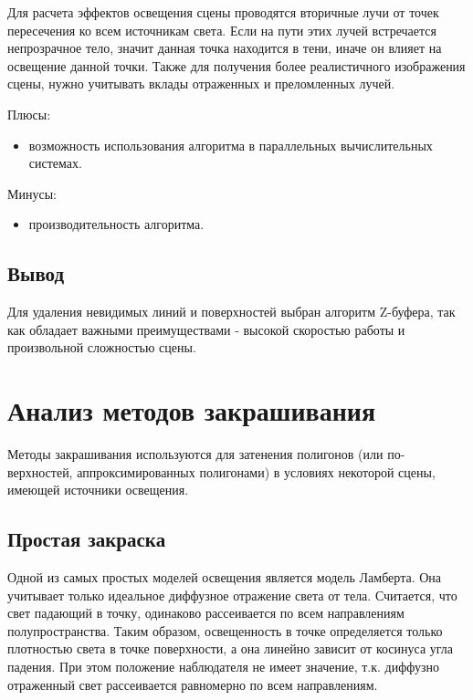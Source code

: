 Для расчета эффектов освещения сцены проводятся вторичные лучи от точек пересечения ко всем источникам света. Если на пути этих лучей встречается непрозрачное тело, значит данная точка находится в тени, иначе он влияет на освещение данной точки. Также для получения более реалистичного изображения сцены, нужно учитывать вклады отраженных и преломленных лучей.

Плюсы:

\begin{itemize}
	\item возможность использования алгоритма в параллельных вычислительных системах.
\end{itemize}

Минусы:

\begin{itemize}
	\item производительность алгоритма.
\end{itemize}

\subsection*{Вывод}

Для удаления невидимых линий и поверхностей выбран алгоритм Z-буфера, так как обладает важными преимуществами - высокой скоростью работы и произвольной сложностью сцены.

\section{Анализ методов закрашивания}

Методы закрашивания используются для затенения полигонов (или по-
верхностей, аппроксимированных полигонами) в условиях некоторой сцены, имеющей источники освещения.

\subsection{Простая закраска}

Одной из самых простых моделей освещения является модель Ламберта. Она учитывает только идеальное диффузное отражение света от тела. Считается, что свет падающий в точку, одинаково рассеивается по всем направлениям полупространства. Таким образом, освещенность в точке определяется только плотностью света в точке поверхности, а она линейно зависит от косинуса угла падения. При этом положение наблюдателя не имеет значение, т.к. диффузно отраженный свет рассеивается равномерно по всем направлениям.

